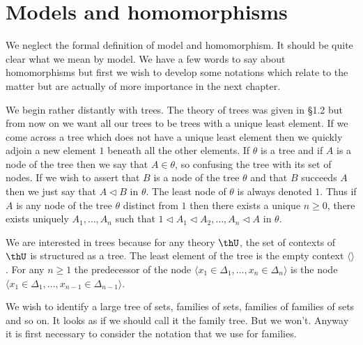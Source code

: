 \section{Models and homomorphisms} \label{sec:source-1-9}

We neglect the formal definition of model and homomorphism.
%
It should be quite clear what we mean by model.
%
We have a few words to say about homomorphisms but first we wish to develop some notations which relate to the matter but are actually of more importance in the next chapter.

We begin rather distantly with trees.
%
The theory of trees was given in \S 1.2 but from now on we want all our trees to be trees with a unique least element.
%
If we come across a tree which does not have a unique least element then we quickly adjoin a new element $1$  beneath all the other elements.
%
If $\theta$ is a tree and if $A$ is a node of the tree then we say that $A\in\theta$, so confusing the tree with its set of nodes.
%
If we wish to assert that $B$ is a node of the tree $\theta$ and that $B$ succeeds $A$ then we just say that $A\triangleleft B$ in $\theta$.
%
The least node of $\theta$ is always denoted $1$.
%
Thus if $A$ is any node of the tree $\theta$ distinct from $1$ then there exists a unique $n\geq 0$, there exists uniquely $A_1,\ldots,A_n$ such that $1\triangleleft A_1\triangleleft A_2,\ldots,A_n\triangleleft A$ in $\theta$.

We are interested in trees because for any theory $\thU$, the set of contexts of $\thU$ is structured as a tree.
%
The least element of the tree is the empty context $\langle\rangle$.
%
For any $n\geq 1$ the predecessor of the node $\langle x_1\in\Delta_1,\ldots,x_n\in\Delta_n\rangle$ is the node $\langle x_1\in\Delta_1,\ldots,x_{n-1}\in\Delta_{n-1}\rangle$.

We wish to identify a large tree of sets, families of sets, families of families of sets and so on.
%
It looks as if we should call it the family tree.
%
But we won't.
%
Anyway it is first necessary to consider the notation that we use for families.


